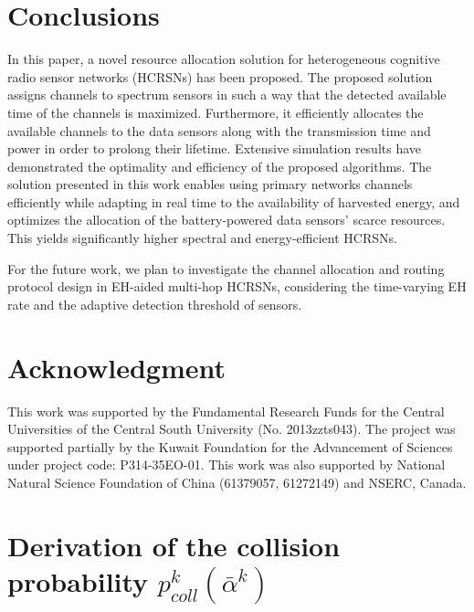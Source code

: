 \documentclass[journal]{IEEEtran} \ifCLASSINFOpdf
\begin{document}
\section{Conclusions} \label{sec:conlusion}

In this paper, a novel resource allocation solution for heterogeneous cognitive radio sensor networks (HCRSNs) has been proposed. The proposed solution assigns channels to spectrum sensors in such a way that the detected available time of the channels is maximized. Furthermore, it efficiently allocates the available channels to the data sensors along with the transmission time and power in order to prolong their lifetime. Extensive simulation results have demonstrated the optimality and efficiency of the proposed algorithms. The solution presented in this work enables using primary networks channels efficiently while adapting in real time to the availability of harvested energy, and optimizes the allocation of the battery-powered data sensors' scarce resources. This yields significantly higher spectral and energy-efficient HCRSNs.


For the future work, we plan to investigate the channel allocation and routing protocol design in EH-aided multi-hop HCRSNs, considering the time-varying EH rate and the adaptive detection threshold of sensors.

\section*{Acknowledgment}
This work was supported by the Fundamental Research Funds for the Central Universities of the Central South University (No. 2013zzts043). The project was supported partially by the Kuwait Foundation for the Advancement of Sciences under project code: P314-35EO-01. This work was also supported by National Natural Science Foundation of China (61379057, 61272149) and NSERC, Canada.




\appendices



\section{Derivation of the collision probability $p_{coll}^k(\bar{\alpha}^{k})$}
\label{Apn_col_prob}
\end{document}
